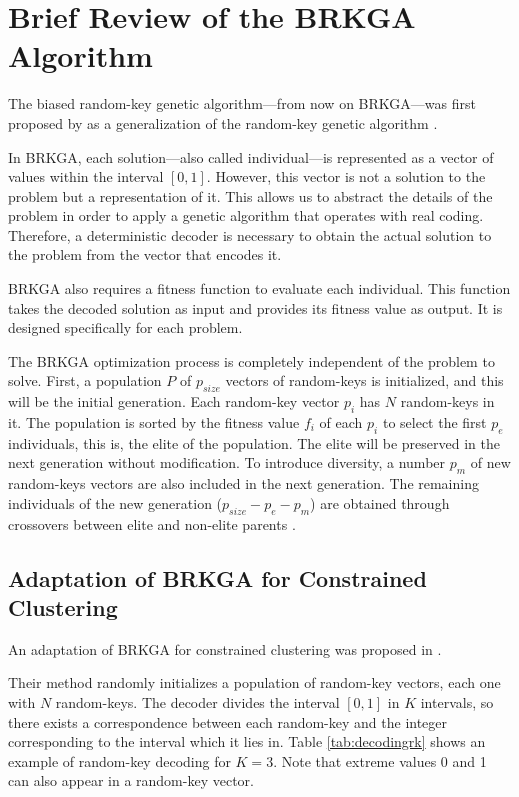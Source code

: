 \documentclass[review]{elsarticle}
\begin{document}
\section{Brief Review of the BRKGA Algorithm}

The biased random-key genetic algorithm---from now on BRKGA---was first proposed by \cite{gonccalves2011biased} as a generalization of the random-key genetic algorithm \cite{bean1994genetic}.

In BRKGA, each solution---also called individual---is represented as a vector of values within the interval $[0,1]$. However, this vector is not a solution to the problem but a representation of it. This allows us to abstract the details of the problem in order to apply a genetic algorithm that operates with real coding. Therefore, a deterministic decoder is necessary to obtain the actual solution to the problem from the vector that encodes it.

BRKGA also requires a fitness function to evaluate each individual. This function takes the decoded solution as input and provides its fitness value as output. It is designed specifically for each problem.

The BRKGA optimization process is completely independent of the problem to solve. First, a population $P$ of $p_{size}$ vectors of random-keys is initialized, and this will be the initial generation. Each random-key vector $p_i$ has $N$ random-keys in it. The population is sorted by the fitness value $f_i$ of each $p_i$ to select the first $p_e$ individuals, this is, the elite of the population. The elite will be preserved in the next generation without modification. To introduce diversity, a number $p_m$ of new random-keys vectors are also included in the next generation. The remaining individuals of the new generation ($p_{size} - p_e - p_m$) are obtained through crossovers between elite and non-elite parents \cite{de2017comparison}.

\subsection{Adaptation of BRKGA for Constrained Clustering} \label{sec:AdaptationofBRKGA}

An adaptation of BRKGA for constrained clustering was proposed in \cite{de2017comparison}.

Their method randomly initializes a population of random-key vectors, each one with $N$ random-keys. The decoder divides the interval $[0,1]$ in $K$ intervals, so there exists a correspondence between each random-key and the integer corresponding to the interval which it lies in. Table \ref{tab:decodingrk} shows an example of random-key decoding for $K = 3$. Note that extreme values 0 and 1 can also appear in a random-key vector.
\end{document}
